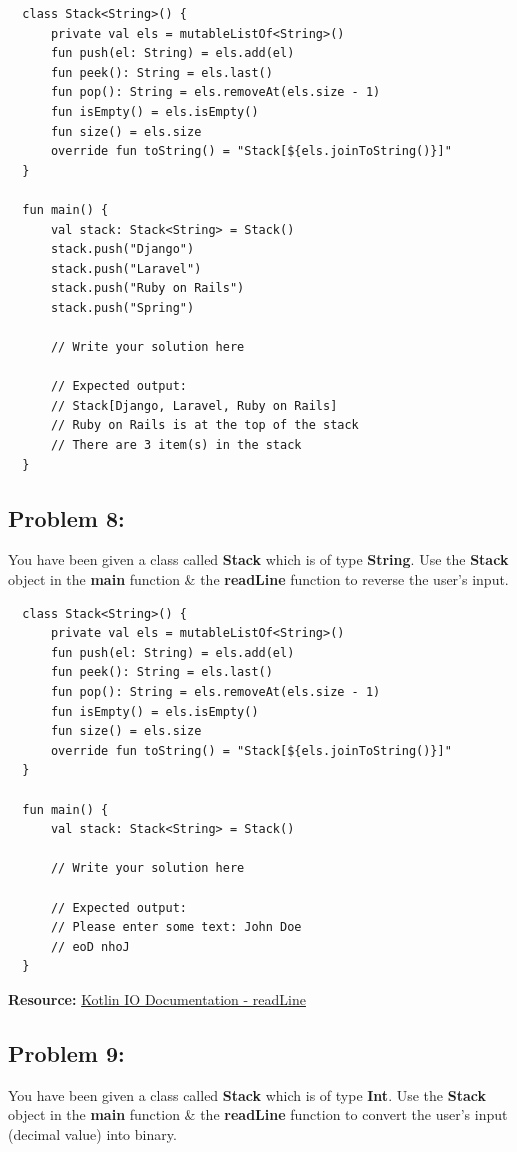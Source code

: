 \documentclass{article}
\begin{document}
\begin{verbatim}
  class Stack<String>() {
      private val els = mutableListOf<String>()
      fun push(el: String) = els.add(el)
      fun peek(): String = els.last()
      fun pop(): String = els.removeAt(els.size - 1)
      fun isEmpty() = els.isEmpty()
      fun size() = els.size
      override fun toString() = "Stack[${els.joinToString()}]"
  }

  fun main() {
      val stack: Stack<String> = Stack()
      stack.push("Django")
      stack.push("Laravel")
      stack.push("Ruby on Rails")
      stack.push("Spring")

      // Write your solution here

      // Expected output:
      // Stack[Django, Laravel, Ruby on Rails]
      // Ruby on Rails is at the top of the stack
      // There are 3 item(s) in the stack
  }
\end{verbatim}

\subsection*{Problem 8:}
You have been given a class called \textbf{Stack} which is of type \textbf{String}. Use the \textbf{Stack} object in the \textbf{main} function \& the \textbf{readLine} function to reverse the user's input.

\begin{verbatim}
  class Stack<String>() {
      private val els = mutableListOf<String>()
      fun push(el: String) = els.add(el)
      fun peek(): String = els.last()
      fun pop(): String = els.removeAt(els.size - 1)
      fun isEmpty() = els.isEmpty()
      fun size() = els.size
      override fun toString() = "Stack[${els.joinToString()}]"
  }

  fun main() {
      val stack: Stack<String> = Stack()

      // Write your solution here

      // Expected output:
      // Please enter some text: John Doe
      // eoD nhoJ
  }
\end{verbatim}

\textbf{Resource:} \href{https://kotlinlang.org/api/latest/jvm/stdlib/kotlin.io/read-line.html}{Kotlin IO Documentation - readLine}

\subsection*{Problem 9:}
You have been given a class called \textbf{Stack} which is of type \textbf{Int}. Use the \textbf{Stack} object in the \textbf{main} function \& the \textbf{readLine} function to convert the user's input (decimal value) into binary.
\end{document}
